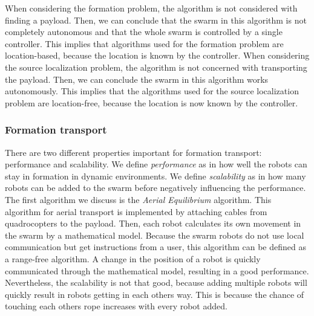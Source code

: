 When considering the formation problem, the algorithm is not considered with finding a payload. 
Then, we can conclude that the swarm in this algorithm is not completely autonomous and that the whole swarm is controlled by a single controller.
This implies that algorithms used for the formation problem are location-based, because the location is known by the controller. \cite{Michael2011cooperative, Mas2012object}
When considering the source localization problem, the algorithm is not concerned with transporting the payload. 
Then, we can conclude the swarm in this algorithm works autonomously. 
This implies that the algorithms used for the source localization problem are location-free, because the location is now known by the controller. \cite{Rubenstein2013collecive, sugawara2012object}

\subsubsection{Formation transport}
There are two different properties important for formation transport: performance and scalability. 
We define \emph{performance} as in how well the robots can stay in formation in dynamic environments. 
We define \emph{scalability} as in how many robots can be added to the swarm before negatively influencing the performance.\\

The first algorithm we discuss is the \emph{Aerial Equilibrium} algorithm. \cite{Michael2011cooperative}
This algorithm for aerial transport is implemented by attaching cables from quadrocopters to the payload.
Then, each robot calculates its own movement in the swarm by a mathematical model. 
Because the swarm robots do not use local communication but get instructions from a user, this algorithm can be defined as a range-free algorithm. 
A change in the position of a robot is quickly communicated through the mathematical model, resulting in a good performance.
Nevertheless, the scalability is not that good, because adding multiple robots will quickly result in robots getting in each others way.
This is because the chance of touching each others rope increases with every robot added. \\

